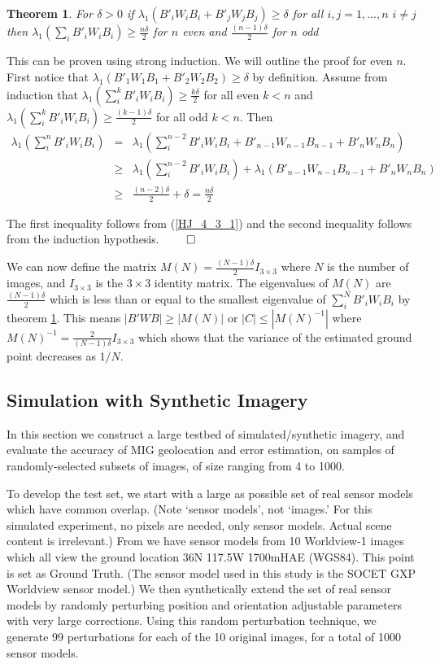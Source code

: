 \documentclass[10pt]{amsart}
\newtheorem{theorem}{Theorem}
\begin{document}
\begin{theorem} \label{theorem_1}
	 For $\delta > 0$ if $\lambda_1(B'_iW_iB_i + B'_jW_jB_j) \geq \delta$
         for all $i, j = 1, \dots, n$ $i \ne j$ then $\lambda_1(\sum_i
         B'_iW_iB_i) \geq \frac{n\delta}{2}$ for $n$ even and
         $\frac{(n-1)\delta}{2}$ for $n$ odd
\end{theorem}

This can be proven using strong induction.  We will outline the proof for even
$n$.  First notice that $\lambda_1(B'_1W_1B_1 + B'_2W_2B_2) \geq \delta$ by
definition.  Assume from induction that $\lambda_1(\sum^k_i B'_iW_iB_i) \geq \frac{k\delta}{2}$ for
all even $k < n$ and $\lambda_1(\sum^k_i B'_iW_iB_i) \geq
\frac{(k-1)\delta}{2}$ for all odd $k < n$.  Then
\begin{eqnarray*}
\lambda_1(\sum^n_iB'_iW_iB_i) &=&\lambda_1(\sum^{n-2}_i B'_iW_iB_i + B'_{n-1}W_{n-1}B_{n-1} +  B'_{n}W_{n}B_{n})\\
&\geq&\lambda_1(\sum^{n-2}_i B'_iW_iB_i) +  \lambda_1(B'_{n-1}W_{n-1}B_{n-1} + B'_{n}W_{n}B_{n})\\
&\geq&\frac{(n-2)\delta}{2} + \delta = \frac{n\delta}{2}
\end{eqnarray*}

The first inequality follows from (\ref{HJ_4_3_1}) and the second
inequality follows from the induction hypothesis. $\qed$

We can now define the matrix $M(N) = \frac{(N-1)\delta}{2}I_{3 \times 3}$ where 
$N$ is the number of images, and $I_{3\times 3}$ is the $3 \times 3$ identity matrix. The eigenvalues of $M(N)$
are $\frac{(N-1)\delta}{2}$ which is less than or equal to the smallest
eigenvalue of $\sum^N_i B'_iW_iB_i$ by theorem \ref{theorem_1}.  This means
$|B'WB| \geq |M(N)|$ or $|C| \leq |M(N)^{-1}|$ where $M(N)^{-1} =
\frac{2}{(N-1)\delta}I_{3\times 3}$ which shows that the variance of the
estimated ground point decreases as $1/N$.

\subsection{\label{simulation}Simulation with Synthetic Imagery}
In this section we construct a large testbed of simulated/\-syn\-the\-tic imagery, and
evaluate the accuracy of MIG geolocation and error estimation, on samples of
randomly-selected subsets of images, of size ranging from 4 to 1000.

To develop the test set, we start with a large as possible set of real sensor
models which have common overlap. (Note `sensor models', not `images.' For
this simulated experiment, no pixels are needed, only sensor models. Actual
scene content is irrelevant.)  From \cite{MIN} we have sensor models from 10
Worldview-1 images which all view the ground location 36N 117.5W 1700mHAE
(WGS84). This point is set as Ground Truth. (The sensor model used in this study
is the SOCET GXP \cite{SGXP} Worldview sensor model.) We then synthetically
extend the set of real sensor models by randomly perturbing position and
orientation adjustable parameters with very large corrections. Using this random
perturbation technique, we generate 99 perturbations for each of the 10
original images, for a total of 1000 sensor models.
\end{document}
